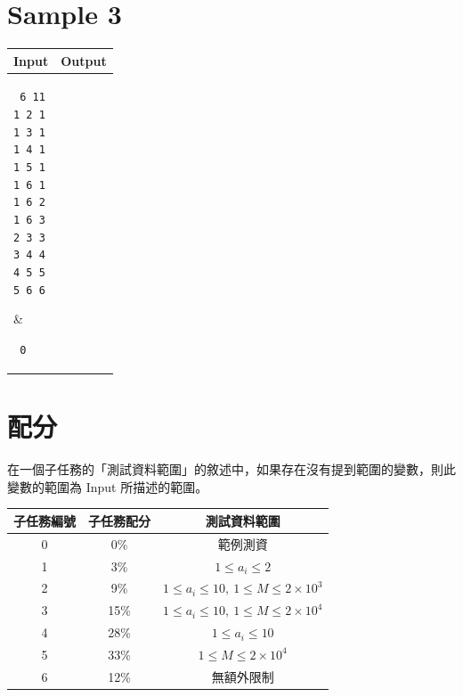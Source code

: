 \documentclass[11pt,a4paper]{article}
\begin{document}
\newpage
\section*{Sample 3}
\begin{longtable}[!h]{|p{}|p{}|}
\hline
\textbf {Input}	& \textbf {Output} \\
\hline
\parbox[t]{0.5\textwidth} %
{ \tt
6 11 \\
1 2 1 \\
1 3 1 \\
1 4 1 \\
1 5 1 \\
1 6 1 \\
1 6 2 \\
1 6 3 \\
2 3 3 \\
3 4 4 \\
4 5 5 \\
5 6 6 \\
} &
\parbox[t]{0.5\textwidth}
{ \tt
0 \\
} \\
\hline
\end{longtable}

\section*{配分}

在一個子任務的「測試資料範圍」的敘述中，如果存在沒有提到範圍的變數，則此變數的範圍為 Input 所描述的範圍。

\begin{center}
 \begin{tabular}{||c c c||} 
 \hline
 子任務編號 & 子任務配分 & 測試資料範圍 \\  
 \hline\hline
 0 & 0\% & 範例測資 \\ 
 \hline
 1 & 3\% & $1 \le a_i \le 2$ \\
 \hline
 2 & 9\% & $1 \le a_i \le 10,\ 1 \le M \le 2\times 10^3$ \\
 \hline
 3 & 15\% & $1 \le a_i \le 10,\ 1 \le M \le 2\times 10^4$ \\
 \hline
 4 & 28\% & $1 \le a_i \le 10$ \\
 \hline
 5 & 33\% & $1 \le M \le 2\times 10^4$ \\
 \hline
 6 & 12\% & 無額外限制 \\ 
 \hline
\end{tabular}
\end{center}
\end{document}
